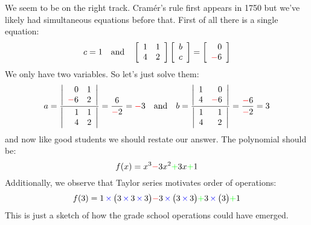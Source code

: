 \documentclass[12pt]{article}
\begin{document}
We seem to be on the r{\color{blue}i}ght track.  Cram\'{e}r's rule f{\color{blue}i}rst appears {\color{blue}i}n 1750 but we've l{\color{blue}i}kely had s{\color{blue}i}multaneous equat{\color{blue}i}ons before that.  F{\color{blue}i}rst of all there {\color{blue}i}s a s{\color{blue}i}ngle equat{\color{blue}i}on:
$$ c = 1  \quad\text{and}\quad 
\left[ 
\begin{array}{rr} 
 1 & 1  \\
 4 & 2 \end{array}\right]
\left[ 
\begin{array}{r} 
b  \\
c  \end{array}\right] = 
\left[ 
\begin{array}{r} 
0 \\
{\color{red}-}6 \end{array}\right] 
$$
We only have two var{\color{blue}i}ables. So let's just solve them:
$$ 
a = \frac{
\left| 
\begin{array}{rr} 
 0 & 1  \\
 {\color{red}-}6 & 2 \end{array}\right|
}{\left| 
\begin{array}{rr} 
 \;\;\;1 & 1  \\
 4 & 2 \end{array}\right|} = \frac{6}{{\color{red}-}2}={\color{red}-}3
\quad\text{and}\quad
 b = \frac{
 \left| 
\begin{array}{rr} 
 1 & 0  \\
 4 & {\color{red}-}6 \end{array}\right|
 }{\left| 
\begin{array}{rr} 
 1 & 1  \\
 4 & \;\;\,2 \end{array}\right|} = \frac{{\color{red}-}6}{{\color{red}-}2}=3$$
and now l{\color{blue}i}ke good students we should restate our answer.  The polynom{\color{blue}i}al should be:
$$ f(x) = x^3 {\color{red}-}3x^2 {\color{green}+} 3x {\color{green}+} 1$$
Add{\color{blue}i}t{\color{blue}i}onally, we observe that Taylor ser{\color{blue}i}es mot{\color{blue}i}vates order of operat{\color{blue}i}ons:
$$ f(3) = 1 {\color{blue}\,\times\,}\big(3 {\color{blue}\,\times\,} 3 {\color{blue}\,\times\,} 3\big) {\color{red}-} 3 {\color{blue}\,\times\,} \big(3 {\color{blue}\,\times\,} 3\big) {\color{green}+} 3 {\color{blue}\,\times\,} \big(3\big) {\color{green}+} 1 $$
Th{\color{blue}i}s {\color{blue}i}s just a sketch of how the grade school operat{\color{blue}i}ons could have emerged. 
\end{document}
